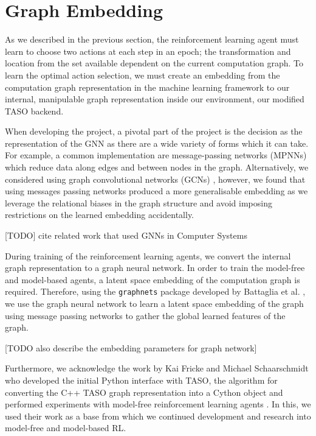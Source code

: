 \section{Graph Embedding}
\label{sec:design:subsec:embed}
As we described in the previous section, the reinforcement learning agent must learn to choose two actions at each step in an epoch; the transformation and location from the set available dependent on the current computation graph. To learn the optimal action selection, we must create an embedding from the computation graph representation in the machine learning framework to our internal, manipulable graph representation inside our environment, our modified TASO backend.

When developing the project, a pivotal part of the project is the decision as the representation of the GNN as there are a wide variety of forms which it can take. For example, a common implementation are message-passing networks (MPNNs) \cite{gilmer2017neural} which reduce data along edges and between nodes in the graph. Alternatively, we considered using graph convolutional networks (GCNs) \cite{kipf2016semi}, however, we found that using messages passing networks produced a more generalisable embedding as we leverage the relational biases in the graph structure and avoid imposing restrictions on the learned embedding accidentally.

[TODO] cite related work that used GNNs in Computer Systems

During training of the reinforcement learning agents, we convert the internal graph representation to a graph neural network. In order to train the model-free and model-based agents, a latent space embedding of the computation graph is required. Therefore, using the \texttt{graph\textunderscore nets} package developed by Battaglia et al. \cite{battaglia2018relational}, we use the graph neural network to learn a latent space embedding of the graph using message passing networks to gather the global learned features of the graph.

[TODO also describe the embedding parameters for graph network]

Furthermore, we acknowledge the work by Kai Fricke and Michael Schaarschmidt who developed the initial Python interface with TASO, the algorithm for converting the C++ TASO graph representation into a Cython object and performed experiments with model-free reinforcement learning agents \cite{xflowrl2019}. In this, we used their work as a base from which we continued development and research into model-free and model-based RL.
